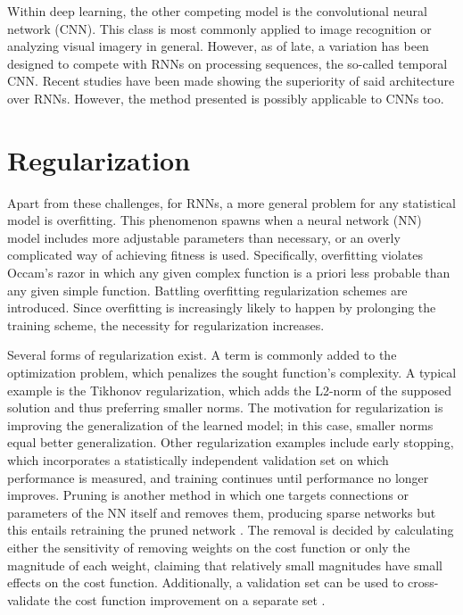 Within deep learning, the other competing model is the convolutional neural network (CNN). This class is most commonly applied to image recognition or analyzing visual imagery in general. However, as of late, a variation has been designed to compete with RNNs on processing sequences, the so-called temporal CNN. Recent studies have been made showing the superiority of said architecture over RNNs\cite{tcnvsrnn}. However, the method presented is possibly applicable to CNNs too.

\section{Regularization}

Apart from these challenges, for RNNs, a more general problem for any statistical model is overfitting. This phenomenon spawns when a neural network (NN) model includes more adjustable parameters than necessary, or an overly complicated way of achieving fitness is used. Specifically, overfitting violates Occam's razor in which any given complex function is a priori less probable than any given simple function. Battling overfitting regularization schemes are introduced. Since overfitting is increasingly likely to happen by prolonging the training scheme, the necessity for regularization increases.

Several forms of regularization exist. A term is commonly added to the optimization problem, which penalizes the sought function's complexity. A typical example is the Tikhonov regularization, which adds the L2-norm of the supposed solution and thus preferring smaller norms. The motivation for regularization is improving the generalization of the learned model; in this case, smaller norms equal better generalization. Other regularization examples include early stopping, which incorporates a statistically independent validation set on which performance is measured, and training continues until performance no longer improves. Pruning is another method in which one targets connections or parameters of the NN itself and removes them, producing sparse networks but this entails retraining the pruned network \cite{Yann}. The removal is decided by calculating either the sensitivity of removing weights on the cost function or only the magnitude of each weight, claiming that relatively small magnitudes have small effects on the cost function. Additionally, a validation set can be used to cross-validate the cost function improvement on a separate set \cite{prunings}. 

